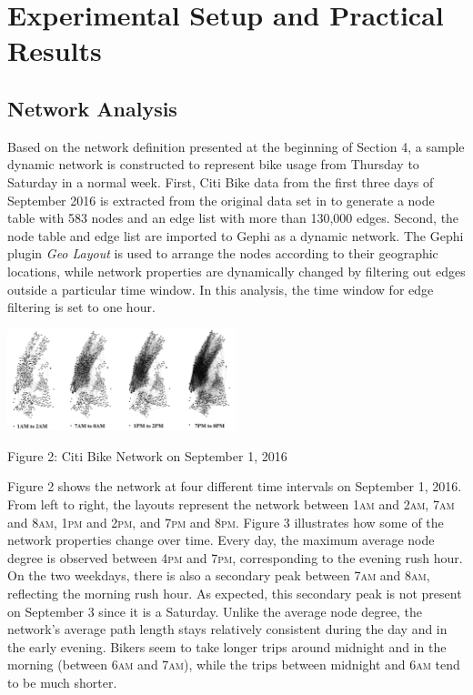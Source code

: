 \documentclass[times, 10pt,twocolumn]{article}
\begin{document}
\section{Experimental Setup and Practical Results}

\subsection{Network Analysis}
Based on the network definition presented at the beginning of Section 4, a sample dynamic network is constructed to represent bike usage from Thursday to Saturday in a normal week. First, Citi Bike data from the first three days of September 2016 is extracted from the original data set in \cite{dataset} to generate a node table with 583 nodes and an edge list with more than 130,000 edges. Second, the node table and edge list are imported to Gephi as a dynamic network. The Gephi plugin \textit{Geo Layout} is used to arrange the nodes according to their geographic locations, while network properties are dynamically changed by filtering out edges outside a particular time window. In this analysis, the time window for edge filtering is set to one hour.\\

\centerline{\includegraphics[width=0.5\textwidth]{m4/combined.jpg}}
\centerline{Figure 2: Citi Bike Network on September 1, 2016}
\hfill \break
\indent Figure 2 shows the network at four different time intervals on September 1, 2016. From left to right, the layouts represent the network between 1\textsc{am} and 2\textsc{am}, 7\textsc{am} and 8\textsc{am}, 1\textsc{pm} and 2\textsc{pm}, and 7\textsc{pm} and 8\textsc{pm}. Figure 3 illustrates how some of the network properties change over time. Every day, the maximum average node degree is observed between 4\textsc{pm} and 7\textsc{pm}, corresponding to the evening rush hour. On the two weekdays, there is also a secondary peak between 7\textsc{am} and 8\textsc{am}, reflecting the morning rush hour. As expected, this secondary peak is not present on September 3 since it is a Saturday. Unlike the average node degree, the network's average path length stays relatively consistent during the day and in the early evening. Bikers seem to take longer trips around midnight and in the morning (between 6\textsc{am} and 7\textsc{am}), while the trips between midnight and 6\textsc{am} tend to be much shorter.
\end{document}
